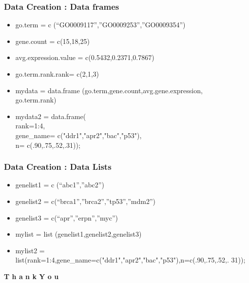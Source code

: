 \documentclass[12pt]{beamer}
\begin{document}
\begin{frame}[fragile]
\frametitle{Data Creation : Data frames}
\begin{itemize}\justifying
	\item go.term = c (“GO0009117”,”GO0009253”,”GO0009354”)
	\item  gene.count = c(15,18,25)
	\item 	 avg.expression.value = c(0.5432,0.2371,0.7867)
	\item  go.term.rank.rank= c(2,1,3)
	\item  mydata = data.frame
	(go.term,gene.count,avg.gene.expression,\\go.term.rank)
	\item  mydata2 =
	data.frame(\\rank=1:4,\\gene\_name= c("ddr1","apr2","bac","p53"),\\n=
	c(.90,.75,.52,.31));
\end{itemize}
\end{frame}



\begin{frame}[fragile]
\frametitle{Data Creation : Data Lists}
\begin{itemize}\justifying
	\item genelist1 = c (“abc1”,”abc2”)
	\item  genelist2 = c(“brca1”,”brca2”,”tp53”,”mdm2”)
	\item genelist3 = c(“apr”,”erpn”,”myc”)
	\item  mylist = list (genelist1,genelist2,genelist3)
	\item  mylist2 =
	list(rank=1:4,gene\_name=c("ddr1","apr2","bac","p53"),n=c(.90,.75,.52,.
	31));
\end{itemize}
\end{frame}
\begin{frame}
 \begin{center}
\begin{block}{}
\hspace*{2in}\textbf{\LARGE \textcolor{idrbt_dark_blue}{T}\pause
			    \textcolor{idrbt_blue}{h}\pause
			    \textcolor{idrbt_dark_blue}{a}\pause
			    \textcolor{idrbt_blue}{n}\pause
			    \textcolor{idrbt_dark_blue}{k}\pause
			    \textcolor{idrbt_dark_blue}{Y}\pause
			    \textcolor{idrbt_blue}{o}\pause
			    \textcolor{idrbt_dark_blue}{u} }
\end{block}\end{center}
\end{frame}
\end{document}

